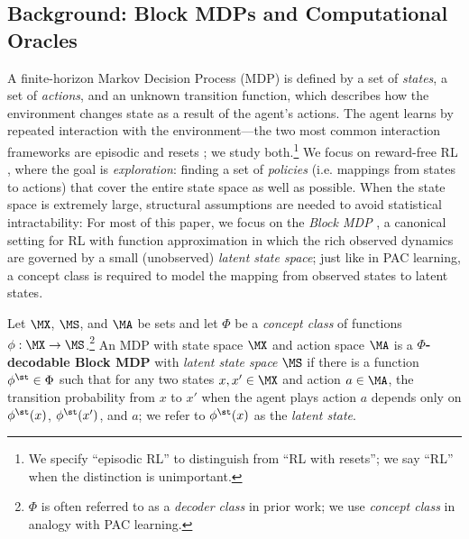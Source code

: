 \subsection{Background: Block MDPs and Computational Oracles}

A finite-horizon Markov Decision Process (MDP) is defined by a set of \emph{states}, a set of \emph{actions}, and an unknown transition function, which describes how the environment changes state as a result of the agent's actions. The agent learns by repeated interaction with the environment---the two most common interaction frameworks are episodic \citep{kearns2002near} and resets \citep{weisz2021query}; we study both.\footnote{We specify ``episodic RL'' to distinguish from ``RL with resets''; we say ``RL'' when the distinction is unimportant.} We focus on reward-free RL \citep{du2019provably,jin2020reward}, where the goal is \emph{exploration}: finding a set of \emph{policies} (i.e. mappings from states to actions) that cover the entire state space as well as possible. When the state space is extremely large, structural assumptions are needed to avoid statistical intractability: For most of this paper, we focus on the \emph{Block MDP} \citep{du2019provably,misra2020kinematic}, a canonical setting for RL with function approximation in which the rich observed dynamics are governed by a small (unobserved) \emph{latent state space}; just like in PAC learning, a concept class is required to model the mapping from observed states to latent states. %

\begin{definition}
  Let $\MX$, $\MS$, and $\MA$ be sets and let $\Phi$ be a \emph{concept class} of functions $\phi: \MX \to \MS$.\footnote{$\Phi$ is often referred to as a \emph{decoder class} in prior work; we use \emph{concept class} in analogy with PAC learning.}
  An MDP with state space $\MX$ and action space $\MA$ is a \textbf{$\Phi$-decodable Block MDP} with \emph{latent state space} $\MS$ if there is a function $\phi^\st\in\Phi$ such that for any two states $x,x'\in\MX$ and action $a \in\MA$, the transition probability from $x$ to $x'$ when the agent plays action $a$ depends only on $\phi^\st(x)$, $\phi^\st(x')$, and $a$; we refer to $\phi^{\st}(x)$ as the \emph{latent state}.\loose
\end{definition}

